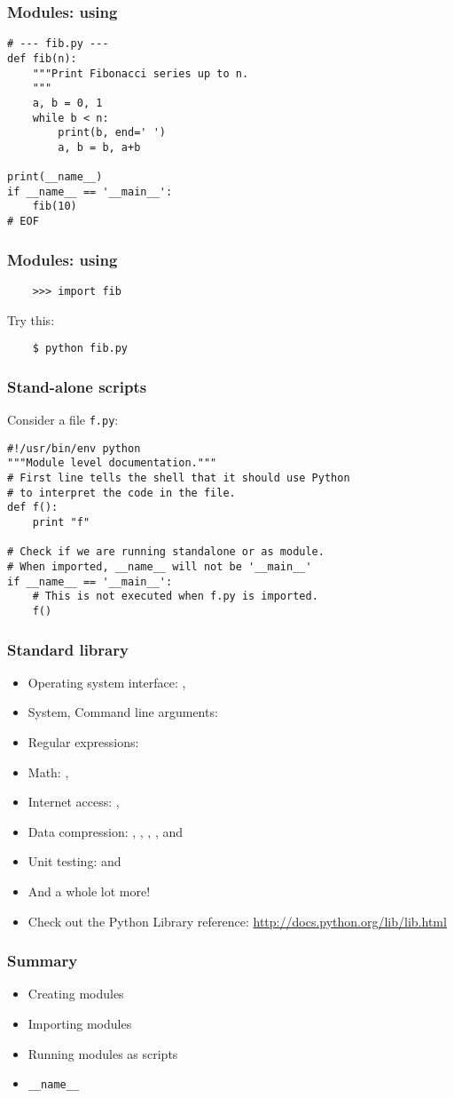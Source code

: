 \documentclass[14pt,compress]{beamer}
\begin{document}
\begin{frame}[fragile]
  \frametitle{Modules: using }
  \vspace*{-1ex}
  \begin{lstlisting}
# --- fib.py ---
def fib(n):
    """Print Fibonacci series up to n.
    """
    a, b = 0, 1
    while b < n:
        print(b, end=' ')
        a, b = b, a+b

print(__name__)
if __name__ == '__main__':
    fib(10)
# EOF
  \end{lstlisting}
\end{frame}

\begin{frame}[fragile]
  \frametitle{Modules: using }
  \begin{lstlisting}
    >>> import fib
  \end{lstlisting}
  Try this:
  \begin{lstlisting}
    $ python fib.py
  \end{lstlisting} %
\end{frame}

\begin{frame}[fragile]
  \frametitle{Stand-alone scripts}
Consider a file \texttt{f.py}:
\footnotesize
\begin{lstlisting}
#!/usr/bin/env python
"""Module level documentation."""
# First line tells the shell that it should use Python
# to interpret the code in the file.
def f():
    print "f"

# Check if we are running standalone or as module.
# When imported, __name__ will not be '__main__'
if __name__ == '__main__':
    # This is not executed when f.py is imported.
    f()
\end{lstlisting}
\end{frame}

\begin{frame}
  \frametitle{Standard library}
  \begin{itemize}
  \item Operating system interface: , 
  \item System, Command line arguments: 
  \item Regular expressions: 
  \item Math: , 
  \item Internet access: , 
  \item Data compression: , , ,
    , and 
  \item Unit testing:  and 
  \item And a whole lot more!
  \item Check out the Python Library reference:
    \url{http://docs.python.org/lib/lib.html}
  \end{itemize}
\end{frame}

\begin{frame}[fragile]
  \frametitle{Summary}
  \begin{itemize}
  \item Creating modules
  \item Importing modules
  \item Running modules as scripts
  \item \texttt{\_\_name\_\_}
  \end{itemize}
\end{frame}
\end{document}
